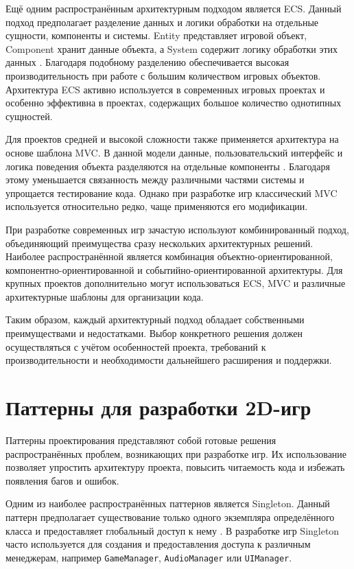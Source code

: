 \documentclass[a4paper,12pt]{report}
\begin{document}
Ещё одним распространённым архитектурным подходом является \acrshort{ECS}. Данный подход предполагает разделение данных и логики обработки на отдельные сущности, компоненты и системы. Entity представляет игровой объект, Component хранит данные объекта, а System содержит логику обработки этих данных \cite{wilnai2025}. Благодаря подобному разделению обеспечивается высокая производительность при работе с большим количеством игровых объектов. Архитектура \acrshort{ECS} активно используется в современных игровых проектах и особенно эффективна в проектах, содержащих большое количество однотипных сущностей.

Для проектов средней и высокой сложности также применяется архитектура на основе шаблона \acrshort{MVC}. В данной модели данные, пользовательский интерфейс и логика поведения объекта разделяются на отдельные компоненты \cite{digitaldragons}. Благодаря этому уменьшается связанность между различными частями системы и упрощается тестирование кода. Однако при разработке игр классический \acrshort{MVC} используется относительно редко, чаще применяются его модификации.

При разработке современных игр зачастую используют комбинированный подход, объединяющий преимущества сразу нескольких архитектурных решений. Наиболее распространённой является комбинация объектно-ориентированной, компонентно-ориентированной и событийно-ориентированной архитектуры. Для крупных проектов дополнительно могут использоваться \acrshort{ECS}, \acrshort{MVC} и различные архитектурные шаблоны для организации кода.

Таким образом, каждый архитектурный подход обладает собственными преимуществами и недостатками. Выбор конкретного решения должен осуществляться с учётом особенностей проекта, требований к производительности и необходимости дальнейшего расширения и поддержки.

\section{Паттерны для разработки 2D-игр}

Паттерны проектирования представляют собой готовые решения распространённых проблем, возникающих при разработке игр. Их использование позволяет упростить архитектуру проекта, повысить читаемость кода и избежать появления багов и ошибок.

Одним из наиболее распространённых паттернов является Singleton. Данный паттерн предполагает существование только одного экземпляра определённого класса и предоставляет глобальный доступ к нему \cite{wilnai2025}. В разработке игр Singleton часто используется для создания и предоставления доступа к различным менеджерам, например \texttt{GameManager}, \texttt{AudioManager} или \texttt{UIManager}.
\end{document}
